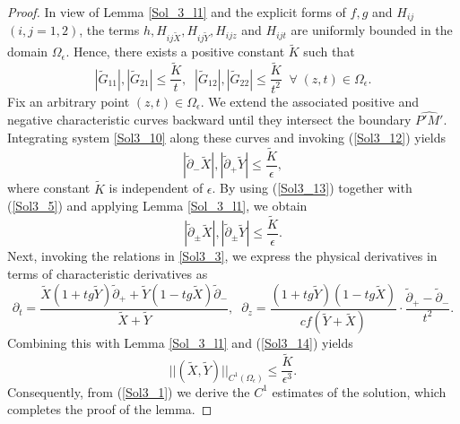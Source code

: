 \documentclass[3p,11pt]{elsarticle}
\numberwithin{equation}{section}
\begin{document}
\begin{proof}
    In view of Lemma \ref{Sol_3_l1} and the explicit forms of $f,g$ and $H_{ij}$ $(i,j=1,2)$, the terms $h, H_{ij\widetilde X}, H_{ij\widetilde Y}, H_{ijz}$ and $H_{ijt}$ are uniformly bounded in the domain $\Omega_\epsilon$. Hence, there exists a positive constant $\widetilde K$ such that
    \begin{equation}\label{Sol3_12}
        |\widetilde G_{11}|, |\widetilde G_{21}| \leq \frac{\widetilde K}{t}, \; \; |\widetilde G_{12}|, |\widetilde G_{22}| \leq \frac{\widetilde K}{t^2}\;\;\forall \; (z,t)\in \Omega_\epsilon.
    \end{equation}
    Fix an arbitrary point $(z,t)\in \Omega_\epsilon$. We extend the associated positive and negative characteristic curves backward until they intersect the boundary $\widehat{P'M'}$. Integrating system \eqref{Sol3_10} along these curves and invoking (\ref{Sol3_12}) yields
    \begin{equation}\label{Sol3_13}
        |\tilde\partial_-\widetilde X|, |\tilde\partial_+\widetilde Y|\leq \frac{\widetilde K}{\epsilon},
    \end{equation}
    where constant $\widetilde K$ is independent of $\epsilon$. By using (\ref{Sol3_13}) together with (\ref{Sol3_5}) and applying Lemma \ref{Sol_3_l1}, we obtain
    \begin{equation}\label{Sol3_14}
         |\tilde\partial_\pm\widetilde X|, |\tilde\partial_\pm\widetilde Y|\leq \frac{\widetilde K}{\epsilon}.
    \end{equation}
    Next, invoking the relations in \eqref{Sol3_3}, we express the physical derivatives in terms of characteristic derivatives as
    \begin{equation*}\label{Sol3_15}
        \partial_t = \frac{\widetilde X(1+tg\widetilde Y)\tilde\partial_++\widetilde Y(1-tg\widetilde X)\tilde\partial_-}{\widetilde X+\widetilde Y},\;\; \partial_z = \frac{(1+tg\widetilde Y)(1-tg\widetilde X)}{cf(\widetilde Y+\widetilde X)}\cdot\frac{\tilde\partial_+-\tilde\partial_-}{t^2}.
    \end{equation*}
    Combining this with Lemma \ref{Sol_3_l1} and (\ref{Sol3_14}) yields
    \begin{equation}
         ||(\widetilde X, \widetilde Y)||_{C^1(\Omega_\epsilon)} \leq \frac{\widetilde K}{\epsilon^3}.
    \end{equation}
    Consequently, from (\ref{Sol3_1}) we derive the $C^{1}$ estimates of the solution, which completes the proof of the lemma.
\end{proof}
\end{document}
